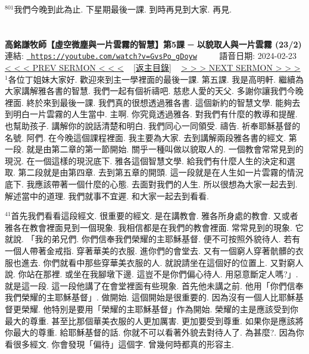 \documentclass{book}
\begin{document}
$^{801}$我們今晚到此為止.
下星期最後一課.
到時再見到大家.
再見.
\newpage



\section{}
\label{sec:GvsPo_gDoyw}
\textbf{高銘謙牧師【虛空微塵與一片雲霧的智慧】第5課 ─ 以貌取人與一片雲霧 (23/2)}
\newline
\newline
連結: \href{https://youtube.com/watch?v=GvsPo_gDoyw}{\texttt{ https://youtube.com/watch?v=GvsPo\_gDoyw}} ~~~~ 語音日期: 2024-02-23 
\newline
\newline
\hyperref[sec:_CzKRoa8y_w]{\small{< < < PREV SERMON < < <}}
~
\hyperref[sec:index]{\small{[返主目錄]}}
~
\hyperref[sec:liEtjDNazis]{\small{> > > NEXT SERMON > > >}}
\newline
\newline
$^{1}$各位丁姐妹大家好.
歡迎來到主一學裡面的最後一課.
第五課.
我是高明軒.
繼續為大家講解雅各書的智慧.
我們一起有個祈禱吧.
慈悲人愛的天父.
多謝你讓我們今晚裡面.
終於來到最後一課.
我們真的很想透過雅各書.
這個新約的智慧文學.
能夠去到明白一片雲霧的人生當中.
主啊.
你究竟透過雅各.
對我們有什麼的教導和提醒.
也幫助孩子.
講解你的說話清楚和明白.
我們同心一同領受.
禱告.
祈奉耶穌基督的名號.
阿們.
在今晚這個課程裡面.
我主要為大家.
去到講解兩段雅各書的經文.
第一段.
就是由第二章的第一節開始.
關乎一種叫做以貌取人的.
一個教會常常見到的現況.
在一個這樣的現況底下.
雅各這個智慧文學.
給我們有什麼人生的決定和選取.
第二段就是由第四章.
去到第五章的開頭.
這一段就是在人生如一片雲霧的情況底下.
我應該帶著一個什麼的心態.
去面對我們的人生.
所以很想為大家一起去到.
解述當中的道理.
我們就事不宜遲.
和大家一起去到看看.

$^{41}$首先我們看看這段經文.
很重要的經文.
是在講教會.
雅各所身處的教會.
又或者雅各在教會裡面見到一個現象.
我相信都是在我們的教會裡面.
常常見到的現象.
它就說.
「我的弟兄們.
你們信奉我們榮耀的主耶穌基督.
便不可按照外貌待人.
若有一個人帶著金戒指.
穿著華美的衣服.
進你們的會堂去.
又有一個窮人穿著骯髒的衣服也進去.
你們就看中那些穿華美衣服的人.
就說請坐在這個好的位置上.
又對窮人說.
你站在那裡.
或坐在我腳墩下邊.
這豈不是你們偏心待人.
用惡意斷定人嗎?」.
就是這一段.
這一段他講了在會堂裡面有些現象.
首先他未講之前.
他用「你們信奉我們榮耀的主耶穌基督」.
做開始.
這個開始是很重要的.
因為沒有一個人比耶穌基督更榮耀.
他特別是要用「榮耀的主耶穌基督」作為開始.
榮耀的主是應該受到你最大的尊重.
甚至比那個華美衣服的人更加厲害.
更加要受到尊重.
如果你是應該將你最大的尊重.
給耶穌基督的話.
你就不可以看著外貌去對待人了.
為甚麼?.
因為你看很多經文.
你會發現「偏待」這個字.
曾幾何時都真的形容主.
\end{document}
